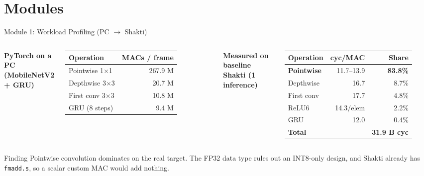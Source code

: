 \documentclass[aspectratio=169,11pt]{beamer}
\begin{document}
\section{Modules}
\begin{frame}{Module 1: Workload Profiling (PC $\rightarrow$ Shakti)}
  \begin{columns}[T]
    \small\textbf{PyTorch on a PC (MobileNetV2 + GRU)}\\[1mm]
    \begin{tabular}{lr}\toprule
      Operation & MACs / frame\\\midrule
      Pointwise 1$\times$1 & 267.9 M\\
      Depthwise 3$\times$3 & 20.7 M\\
      First conv 3$\times$3 & 10.8 M\\
      GRU (8 steps) & 9.4 M\\\bottomrule
    \end{tabular}
    \small\textbf{Measured on baseline Shakti (1 inference)}\\[1mm]
    \begin{tabular}{lrr}\toprule
      Operation & cyc/MAC & Share\\\midrule
      \textbf{Pointwise} & 11.7--13.9 & \textbf{83.8\%}\\
      Depthwise & 16.7 & 8.7\%\\
      First conv & 17.7 & 4.8\%\\
      ReLU6 & 14.3/elem & 2.2\%\\
      GRU & 12.0 & 0.4\%\\\midrule
      \textbf{Total} & & \textbf{31.9 B cyc}\\\bottomrule
    \end{tabular}
  \end{columns}
  \vspace{3mm}
  \begin{block}{Finding}
    Pointwise convolution dominates on the real target. The FP32 data type
    rules out an INT8-only design, and Shakti already has \texttt{fmadd.s},
    so a scalar custom MAC would add nothing.
  \end{block}
\end{frame}
\end{document}
